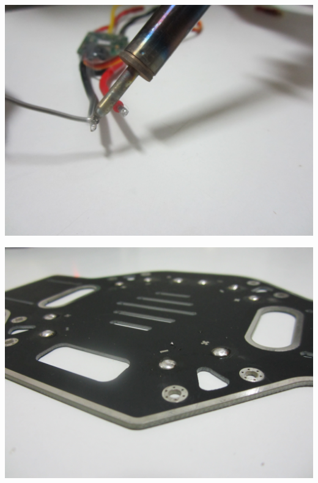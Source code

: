 \documentclass[12pt, a4paper,twoside]{tesi_upf}
\begin{document}
\begin{minipage}{0.5\textwidth}
  \centering
  \includegraphics[width=0.8\linewidth]{Images/Mounting/IMG_0371.jpg}
  \label{fig:app1}
\end{minipage}%
\begin{minipage}{0.5\textwidth}
  \centering
  \includegraphics[width=0.8\linewidth]{Images/Mounting/IMG_0374.jpg}
  \label{fig:app2}
\end{minipage}
\\[12 pt]
\end{document}
